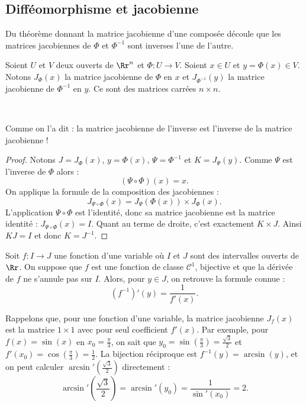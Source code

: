 \documentclass[11pt, class=report,crop=false]{standalone}
\begin{document}
\subsection{Difféomorphisme et jacobienne}

Du théorème donnant la matrice jacobienne d'une composée découle que les matrices jacobiennes de $\Phi$ et $\Phi^{-1}$ sont inverses l'une de l'autre.

Soient $U$ et $V$ deux ouverts de $\Rr^n$ et $\Phi:U\to V$.
Soient $x \in U$ et $y = \Phi(x) \in V$.
Notons $J_\Phi(x)$ la matrice jacobienne de $\Phi$ en $x$ 
et $J_{\Phi^{-1}}(y)$ la matrice jacobienne de $\Phi^{-1}$ en $y$.
Ce sont des matrices carrées $n\times n$.

\begin{proposition}
\label{prop:invjacob}
~
\end{proposition}
Comme on l'a dit : la matrice jacobienne de l'inverse est l'inverse de la matrice jacobienne !

\begin{proof}
Notons $J = J_\Phi(x)$, $y = \Phi(x)$,  $\Psi = \Phi^{-1}$ et $K = J_\Psi(y)$.
Comme $\Psi$ est l'inverse de $\Phi$ alors :
$$(\Psi \circ \Phi) (x) = x.$$
On applique la formule de la composition des jacobiennes :
$$J_{\Psi \circ \Phi}(x) = J_\Psi(\Phi(x)) \times J_\Phi(x).$$
L'application $\Psi \circ \Phi$ est l'identité, donc sa matrice jacobienne est la matrice identité : $J_{\Psi \circ \Phi}(x) = I$.
Quant au terme de droite, c'est exactement $K \times J$.
Ainsi $K J = I$ et donc $K = J^{-1}$.
\end{proof}


\begin{exemple}
Soit $f : I  \to J$ une fonction d'une variable où $I$ et $J$ sont des intervalles ouverts de $\Rr$. 
On suppose que $f$ est une fonction de classe $\mathcal{C}^1$, bijective et que la dérivée de $f$ ne s'annule pas sur $I$. Alors, pour $y\in J$, on retrouve la formule connue :
$$\left(f^{-1}\right)'(y) = \frac{1}{f'(x)}.$$

Rappelons que, pour une fonction d'une variable, la matrice jacobienne $J_f(x)$ est la matrice $1 \times 1$ avec pour seul coefficient $f'(x)$.
Par exemple, pour $f(x) = \sin(x)$ en $x_0=\frac\pi3$, on sait que $y_0=\sin(\frac\pi3)=\frac{\sqrt3}2$ et $f'(x_0)=\cos(\frac\pi3)=\frac12$.
La bijection réciproque est $f^{-1}(y)=\arcsin(y)$, et on peut calculer $\arcsin'(\frac{\sqrt3}2)$ directement :
$$\arcsin'\left(\frac{\sqrt3}2\right) = \arcsin'(y_0) = \frac{1}{\sin'(x_0)} = 2.$$
\end{exemple}
\end{document}
